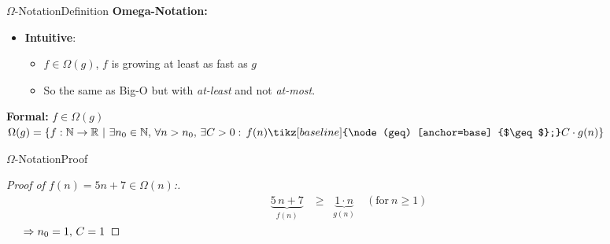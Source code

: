 \begin{frame}{$\Omega$-Notation}{Definition}
  \textbf{Omega-Notation:}
  \begin{itemize}
    \item
      \textbf{Intuitive}:\\

          \begin{itemize}
            \item
              $f \in \Omega(g)$, $f$ is growing at least as fast as $g$
            \item
              So the same as Big-O but with \textit{at-least} and not \textit{at-most}.
          \end{itemize}

  \end{itemize}
 	\begin{block}{\textbf{Formal:} $f \in \Omega(g)$}
    \begin{math}
      \Omega(g) = \lbrace f: \mathbb{N} \to \mathbb{R} ~ | ~
        \exists n_0 \in \mathbb{N}, \, \forall n > n_0, \, \exists C > 0: \,
        f(n) \tikz[baseline] {\node (geq) [anchor=base] {$\geq$};} C \cdot g(n)\rbrace
    \end{math}
 	\end{block}
        \begin{center}
 \end{center}
\end{frame}


\begin{frame}{$\Omega$-Notation}{Proof}
  \begin{proof}[Proof of $f(n) = 5n + 7 \in \Omega(n)$:]
    \begin{eqnarray*}
      &\underbrace{5 \, n + 7}_{f(n)} &\geq \;\; \underbrace{1 \cdot n}_{g(n)}
      \hspace{1em} (\text{for} ~ n \geq 1)
    \end{eqnarray*}
    $\hspace{1.5em} \Rightarrow n_0 = 1, \, C = 1$ \qedhere
  \end{proof}
\end{frame}

